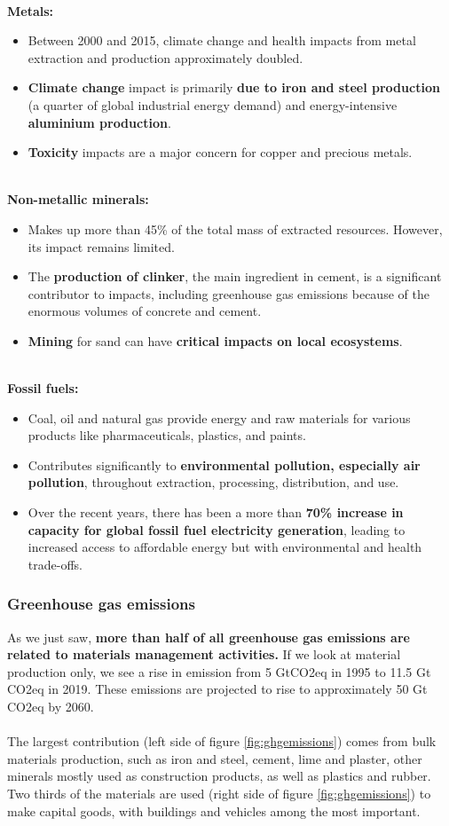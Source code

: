 \documentclass[../summary.tex]{subfiles}
\begin{document}
\ \\
\textbf{Metals:}
\begin{itemize}
	\item Between 2000 and 2015, climate change and health impacts from metal extraction and production approximately doubled.
	\item \textbf{Climate change }impact is primarily \textbf{due to iron and steel production} (a quarter of global industrial energy demand) and energy-intensive \textbf{aluminium production}.
	\item \textbf{Toxicity} impacts are a major concern for copper and precious metals.
\end{itemize}
\ \\
\textbf{Non-metallic minerals:}
\begin{itemize}
	\item Makes up more than 45\% of the total mass of extracted resources. However, its impact remains limited.
	\item The \textbf{production of clinker}, the main ingredient in cement, is a significant contributor to impacts, including greenhouse gas emissions because of the enormous volumes of concrete and cement.
	\item \textbf{Mining} for sand can have \textbf{critical impacts on local ecosystems}.
\end{itemize}
\ \\
\textbf{Fossil fuels:}
\begin{itemize}
	\item Coal, oil and natural gas provide energy and raw materials for various products like pharmaceuticals, plastics, and paints.
	\item Contributes significantly to \textbf{environmental pollution, especially air pollution}, throughout extraction, processing, distribution, and use.
	\item Over the recent years, there has been a more than \textbf{70\% increase in capacity for global fossil fuel electricity generation}, leading to increased access to affordable energy but with environmental and health trade-offs.
\end{itemize}

\subsubsection{Greenhouse gas emissions}

As we just saw, \textbf{more than half of all greenhouse gas emissions are related to materials management activities.} If we look at material production only, we see a rise in emission from 5  GtCO2eq in 1995 to 11.5 Gt CO2eq in 2019. These emissions are projected to rise to approximately 50 Gt CO2eq by 2060. \\
\\
The largest contribution (left side of figure \ref{fig:ghgemissions}) comes from bulk materials production, such as iron and steel, cement, lime and plaster, other minerals mostly used as construction products, as well as plastics and rubber. Two thirds of the materials are used (right side of figure \ref{fig:ghgemissions}) to make capital goods, with buildings and vehicles among the most important. 
\end{document}
